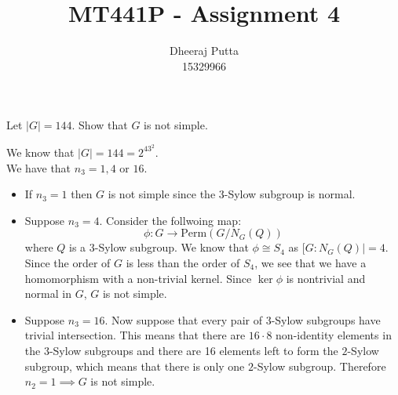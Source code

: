 \documentclass[12pt, answers]{exam}
\title{MT441P - Assignment 4}
\author{Dheeraj Putta \\ 15329966}
\date{}
\begin{document}
    \maketitle
    \begin{questions}
        \thispagestyle{foot}
        \question Let $|G| = 144$. Show that $G$ is not simple.
        \begin{solution}
            We know that $|G| = 144 = 2^43^2$.\\
            We have that $n_3 = 1, 4$ or $16$.
            \begin{itemize}
                \item If $n_3 = 1$ then $G$ is not simple since the $3$-Sylow subgroup is normal.
                \item Suppose $n_3 = 4$. Consider the follwoing map:
                \[ \phi\colon G \to \text{Perm}(G/N_G(Q)) \]
                where $Q$ is a $3$-Sylow subgroup. We know that $\phi \cong S_4$ as $[G: N_G(Q)| = 4$. Since the order of $G$ is less than the order of $S_4$, we see that we have a homomorphism with a non-trivial kernel. Since $\ker \phi$ is nontrivial and normal in $G$, $G$ is not simple.

                \item Suppose $n_3 = 16$. Now suppose that every pair of 3-Sylow subgroups have trivial intersection. This means that there are $16 \cdot 8$ non-identity elements in the $3$-Sylow subgroups and there are 16 elements left to form the $2$-Sylow subgroup, which means that there is only one $2$-Sylow subgroup. Therefore $n_2 = 1\implies G$ is not simple. \\


\end{itemize}
\end{solution}
\end{questions}
\end{document}
